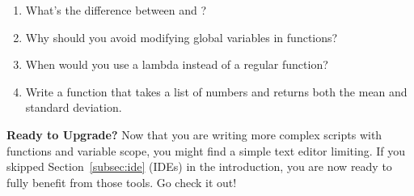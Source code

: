 \begin{ponder}
\begin{enumerate}
    \item What's the difference between  and ?
    \item Why should you avoid modifying global variables in functions?
    \item When would you use a lambda instead of a regular function?
    \item Write a function that takes a list of numbers and returns both the mean and standard deviation.
\end{enumerate}
\end{ponder}

\begin{tip}
\textbf{Ready to Upgrade?}
Now that you are writing more complex scripts with functions and variable scope, you might find a simple text editor limiting. If you skipped Section~\ref{subsec:ide} (IDEs) in the introduction, you are now ready to fully benefit from those tools. Go check it out!
\end{tip}
